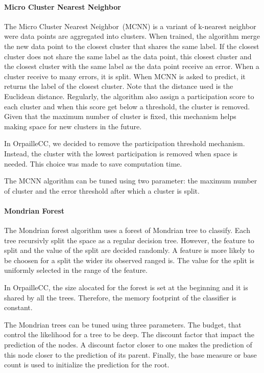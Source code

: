 \paragraph{Micro Cluster Nearest Neighbor~\cite{mc-nn}}
The Micro Cluster Nearest Neighbor~(MCNN) is a variant of k-nearest neighbor
were data points are aggregated into clusters.  When trained, the algorithm
merge the new data point to the closest cluster that shares the same label. If
the closest cluster does not share the same label as the data point, this
closest cluster and the closest cluster with the same label as the data point
receive an error. When a cluster receive to many errors, it is split. When MCNN
is asked to predict, it returns the label of the closest cluster.  Note that
the distance used is the Euclidean distance.
Regularly, the algorithm also assign a participation score to each cluster and
when this score get below a threshold, the cluster is removed. Given that the
maximum number of cluster is fixed, this mechanism helps making space for new
clusters in the future.  

In OrpailleCC, we decided to remove the participation threshold mechanism.
Instead, the cluster with the lowest participation is removed when space is
needed. This choice was made to save computation time.

The MCNN algorithm can be tuned using two parameter: the maximum number of
cluster and the error threshold after which a cluster is split.


\paragraph{Mondrian Forest~\cite{mondrian2014}}
The Mondrian forest algorithm uses a forest of Mondrian tree to classify. Each
tree recursivly split the space as a regular decision tree. However, the
feature to split and the value of the split are decided randomly. A feature is
more likely to be choosen for a split the wider its observed ranged is. The
value for the split is uniformly selected in the range of the feature.

In OrpailleCC, the size alocated for the forest is set at the beginning and it
is shared by all the trees.  Therefore, the memory footprint of the classifier
is constant.

The Mondrian trees can be tuned using three parameters. The budget, that
control the likelihood for a tree to be deep.  The discount factor that impact
the prediction of the nodes. A discount factor closer to one makes the
prediction of this node closer to the prediction of its parent. Finally, the
base measure or base count is used to initialize the prediction for the root.

